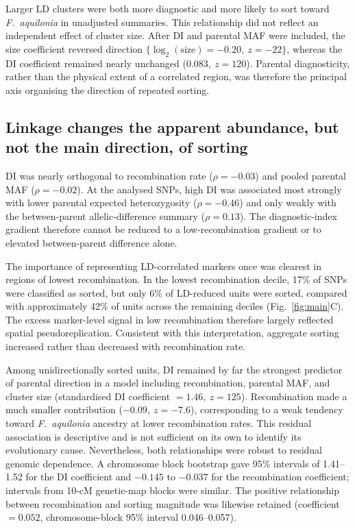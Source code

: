 \documentclass[11pt]{article}
\newcommand{\Faq}{\textit{F.~aquilonia}}
\begin{document}
Larger LD clusters were both more diagnostic and more likely to sort toward
\Faq{} in unadjusted summaries. This relationship did not reflect an
independent effect of cluster size. After DI and parental MAF were included,
the size coefficient reversed direction
\(\{\log_2(\mathrm{size})=-0.20,\ z=-22\}\), whereas the DI coefficient
remained nearly unchanged (\(0.083,\ z=120\)). Parental diagnosticity, rather
than the physical extent of a correlated region, was therefore the principal
axis organising the direction of repeated sorting.

\subsection*{Linkage changes the apparent abundance, but not the main direction, of sorting}

DI was nearly orthogonal to recombination rate
(\(\rho=-0.03\)) and pooled parental MAF (\(\rho=-0.02\)). At the analysed
SNPs, high DI was associated most strongly with lower parental expected
heterozygosity (\(\rho=-0.46\)) and only weakly with the between-parent
allelic-difference summary (\(\rho=0.13\)). The diagnostic-index gradient
therefore cannot be reduced to a low-recombination gradient or to elevated
between-parent difference alone.

The importance of representing LD-correlated markers once was clearest in
regions of lowest recombination. In the lowest recombination decile, 17\% of SNPs
were classified as sorted, but only 6\% of LD-reduced units were sorted,
compared with approximately 42\% of units across the remaining deciles
(Fig.~\ref{fig:main}C). The excess marker-level signal in low recombination
therefore largely reflected spatial pseudoreplication. Consistent with this
interpretation, aggregate sorting increased rather than decreased with
recombination rate.

Among unidirectionally sorted units, DI remained by far the strongest predictor
of parental direction in a model including recombination, parental MAF, and
cluster size (standardised DI coefficient \(=1.46,\ z=125\)). Recombination
made a much smaller contribution
(\(-0.09,\ z=-7.6\)), corresponding to a weak tendency toward \Faq{} ancestry
at lower recombination rates. This residual association is descriptive and is
not sufficient on its own to identify its evolutionary cause. Nevertheless,
both relationships were robust to residual genomic dependence. A chromosome
block bootstrap gave 95\% intervals of 1.41--1.52 for the DI coefficient and
\(-0.145\) to \(-0.037\) for the recombination coefficient; intervals from
10-cM genetic-map blocks were similar. The positive relationship between
recombination and sorting magnitude was likewise retained
(coefficient \(=0.052\), chromosome-block 95\% interval 0.046--0.057).
\end{document}

